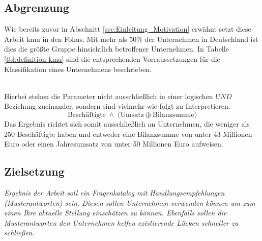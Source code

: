 \documentclass[11pt,a4paper,hidelinks]{article}   %
\begin{document}
    \subsection{Abgrenzung}
        Wie bereits zuvor in Abschnitt \ref{sec:Einleitung_Motivation} erwähnt setzt diese Arbeit \gls{kmu} in den Fokus. Mit mehr als 50\% der Unternehmen in Deutschland ist dies die größte Gruppe hinsichtlich betroffener Unternehmen. In Tabelle \ref{tbl:definition-kmu} sind die entsprechenden Vorraussetzungen für die Klassifikation eines Unternehmens beschrieben. 
        \begin{table}[ht]
            \caption[Definition von kleinen und mittleren Unternehmen]{Definition von kleinen und mittleren Unternehmen\footnotemark}
            \label{tbl:definition-kmu}
        \end{table} \\
        Hierbei stehen die Parameter nicht ausschließlich in einer logischen \(UND\) Beziehung zueinander, sondern sind vielmehr wie folgt zu Interpretieren.
            \[
            \text{Besch\"aftigte} \;\land\;
            \bigl( \text{Umsatz} \oplus \text{Bilanzsumme} \bigr)
            \]
        Das Ergebnis richtet sich somit ausschließlich an Unternehmen, die weniger als 250 Beschäftigte haben und entweder eine Bilanzsumme von unter 43 Millionen Euro oder einen Jahresumsatz von unter 50 Millionen Euro aufweisen.
    \subsection{Zielsetzung}
        \emph{Ergebnis der Arbeit soll ein Fragenkatalog mit Handlungsempfehlungen (Musterantworten) sein. Diesen sollen Unternehmen verwenden können um zum einen Ihre aktuelle Stellung einschätzen zu können. Ebenfalls sollen die Musterantworten den Unternehmen helfen existierende Lücken schneller zu schließen.}
\end{document}
